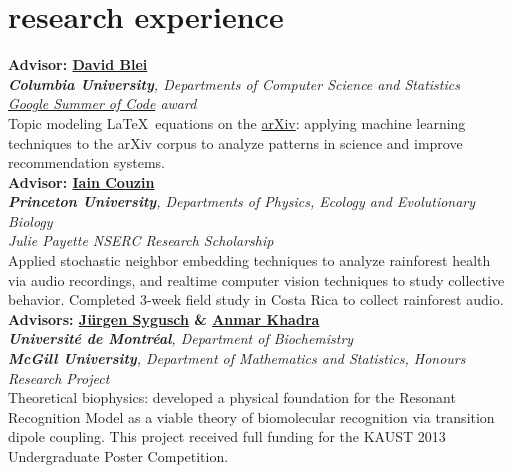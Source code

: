 \documentclass[12pt, letterpaper]{article}
\newcommand{\years}[1]{\marginnote{\normalsize #1}}
\begin{document}
\section*{research experience}
\noindent
\years{4/2014-\hspace*{37pt}}\textbf{Advisor: \href{http://www.cs.princeton.edu/~blei/}{David Blei}}\\
\emph{\textbf{Columbia University}, Departments of Computer Science and Statistics}\\
\emph{\href{https://www.google-melange.com/gsoc/project/details/google/gsoc2014/jaanaltosaar/5741031244955648}{Google Summer of Code} award}\\
Topic modeling \LaTeX~equations on the \href{http://arxiv.org/}{arXiv}: applying machine learning techniques to the arXiv corpus to analyze patterns in science and improve recommendation systems.\\

\years{9/2013-4/2014}\textbf{Advisor: \href{http://icouzin.princeton.edu/}{Iain Couzin}}\\
\emph{\textbf{Princeton University}, Departments of Physics, Ecology and Evolutionary Biology}\\
\emph{Julie Payette NSERC Research Scholarship}\\
Applied stochastic neighbor embedding techniques to analyze rainforest health via audio recordings, and realtime computer vision techniques to study collective behavior. Completed 3-week field study in Costa Rica to collect rainforest audio.\\

\years{9/2012-7/2013}\textbf{Advisors: \href{http://esilrch1.esi.umontreal.ca/~syguschj/home.html}{Jürgen Sygusch} \& \href{http://www.medicine.mcgill.ca/physio/khadralab/}{Anmar Khadra}}\\
\emph{\textbf{Université de Montréal}, Department of Biochemistry}\\
\emph{\textbf{McGill University}, Department of Mathematics and Statistics, Honours Research Project}\\
Theoretical biophysics: developed a physical foundation for the Resonant Recognition Model as a viable theory of biomolecular recognition via transition dipole coupling. This project received full funding for the KAUST 2013 Undergraduate Poster Competition.\\  
\end{document}
